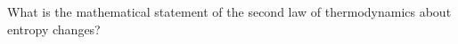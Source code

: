 

\vspace*{\fill}
\centering

What is the mathematical statement of the second law of thermodynamics about entropy changes?

\centering
\vspace*{\fill}

